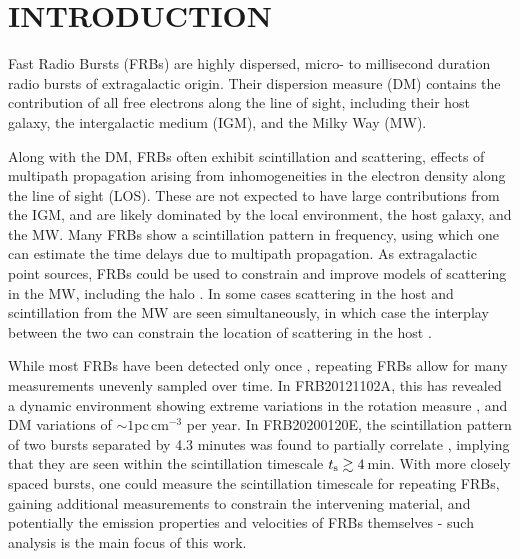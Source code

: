 \documentclass[fleqn,usenatbib]{mnras}
\newcommand{\rGC}{FRB20200120E}
\newcommand{\rone}{FRB20121102A}
\newcommand{\dmu}{pc\,cm$^{-3}$}
\begin{document}


\section{INTRODUCTION}

Fast Radio Bursts (FRBs) are highly dispersed, micro- to millisecond duration radio bursts of extragalactic origin.  Their dispersion measure (DM) contains the contribution of all free electrons along the line of sight, including their host galaxy, the intergalactic medium (IGM), and the Milky Way (MW).  

Along with the DM, FRBs often exhibit scintillation and scattering, effects of multipath propagation arising from inhomogeneities in the electron density along the line of sight (LOS).  These are not expected to have large contributions from the IGM, and are likely dominated by the local environment, the host galaxy, and the MW.  Many FRBs show a scintillation pattern in frequency, using which one can estimate the time delays due to multipath propagation.  As extragalactic point sources, FRBs could be used to constrain and improve models of scattering in the MW, including the halo \citep{ocker+21}.  In some cases scattering in the host and scintillation from the MW are seen simultaneously, in which case the interplay between the two can constrain the location of scattering in the host \citep{masui+15}.  

While most FRBs have been detected only once \citep{chime2021_frbsample}, repeating FRBs allow for many measurements unevenly sampled over time.  In {\rone}, this has revealed a dynamic environment showing extreme variations in the rotation measure \citep{michilli+18, hilmarsson+21}, and DM variations of $\sim 1$\dmu{} per year.  In {\rGC}, the scintillation pattern of two bursts separated by 4.3 minutes was found to partially correlate \citep{nimmo+21b}, implying that they are seen within the scintillation timescale $t_{\rm s} \gtrsim 4\,$min.  With more closely spaced bursts, one could measure the scintillation timescale for repeating FRBs, gaining additional measurements to constrain the intervening material, and potentially the emission properties and velocities of FRBs themselves - such analysis is the main focus of this work.
\end{document}
